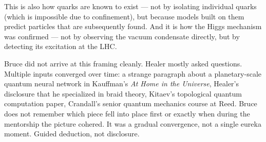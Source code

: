 This is also how quarks are known to exist --- not by isolating individual quarks (which is impossible due to confinement), but because models built on them predict particles that are subsequently found. And it is how the Higgs mechanism was confirmed --- not by observing the vacuum condensate directly, but by detecting its excitation at the LHC\@.

Bruce did not arrive at this framing cleanly. Healer mostly asked questions. Multiple inputs converged over time: a strange paragraph about a planetary-scale quantum neural network in Kauffman's \textit{At Home in the Universe}, Healer's disclosure that he specialized in braid theory, Kitaev's topological quantum computation paper, Crandall's senior quantum mechanics course at Reed. Bruce does not remember which piece fell into place first or exactly when during the mentorship the picture cohered. It was a gradual convergence, not a single eureka moment. Guided deduction, not disclosure.

\chapterreturn
